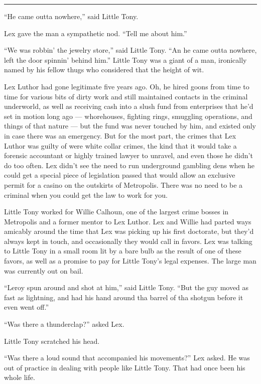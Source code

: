 \begin{center}\rule{0.5\linewidth}{\linethickness}\end{center}

``He came outta nowhere,'' said Little Tony.

Lex gave the man a sympathetic nod. ``Tell me about him.''

``We was robbin' the jewelry store,'' said Little Tony. ``An he came
outta nowhere, left the door spinnin' behind him.'' Little Tony was a
giant of a man, ironically named by his fellow thugs who considered that
the height of wit.

Lex Luthor had gone legitimate five years ago. Oh, he hired goons from
time to time for various bits of dirty work and still maintained
contacts in the criminal underworld, as well as receiving cash into a
slush fund from enterprises that he'd set in motion long ago ---
whorehouses, fighting rings, smuggling operations, and things of that
nature --- but the fund was never touched by him, and existed only in
case there was an emergency. But for the most part, the crimes that Lex
Luthor was guilty of were white collar crimes, the kind that it would
take a forensic accountant or highly trained lawyer to unravel, and even
those he didn't do too often. Lex didn't see the need to run underground
gambling dens when he could get a special piece of legislation passed
that would allow an exclusive permit for a casino on the outskirts of
Metropolis. There was no need to be a criminal when you could get the
law to work for you.

Little Tony worked for Willie Calhoun, one of the largest crime bosses
in Metropolis and a former mentor to Lex Luthor. Lex and Willie had
parted ways amicably around the time that Lex was picking up his first
doctorate, but they'd always kept in touch, and occasionally they would
call in favors. Lex was talking to Little Tony in a small room lit by a
bare bulb as the result of one of these favors, as well as a promise to
pay for Little Tony's legal expenses. The large man was currently out on
bail.

``Leroy spun around and shot at him,'' said Little Tony. ``But the guy
moved as fast as lightning, and had his hand around tha barrel of tha
shotgun before it even went off.''

``Was there a thunderclap?'' asked Lex.

Little Tony scratched his head.

``Was there a loud sound that accompanied his movements?'' Lex asked. He
was out of practice in dealing with people like Little Tony. That had
once been his whole life.

